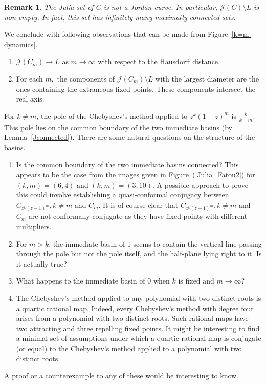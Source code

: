 \documentclass[12pt]{article}
\newtheorem{rem}{Remark}[section]
\begin{document}
\begin{rem}
	The Julia set of $C$ is not a Jordan curve. In particular, $\mathcal{J}(C) \setminus L$ is non-empty. In fact, this set  has infinitely many  maximally connected sets.
\end{rem}



We conclude  with	
 following observations that can be made from Figure~\ref{k=m-dynamics}.
\begin{enumerate}
	
	\item   $\mathcal{J}(C_m) \to L$ as $m \to \infty$ with respect to the Hausdorff distance.
	\item For each $m,$ the components of $\mathcal{J}(C_m) \setminus L$ with the largest diameter are the ones containing the extraneous fixed points. These components intersect  the real axis. 
	
\end{enumerate}

 
For $k \neq m$, the pole of the Chebyshev's method applied to $z^k (1-z)^m$  is $\frac{k}{k+m}$. This pole lies on the common boundary of the two immediate basins (by Lemma~\ref{Jconnected}). 
There are some natural questions on the structure of the basins.



\begin{enumerate}
\item Is the  common boundary of the two immediate basins  connected? This appears to be the case  from the images given in Figure~(\ref{Julia_Fatou2}) for $(k,m)=(6,4)$ and $(k,m)=(3,10)$. A possible approach to prove this could involve establishing a quasi-conformal conjugacy between $C_{z^k (z-1)^m}, k \neq m$ and $C_m$. It is of course clear that $C_{z^k (z-1)^m}, k \neq m$ and $C_m$ are not conformally conjugate as they have fixed points with different multipliers.
	\item For $m>k$, the immediate basin of $1$ seems to contain the vertical line passing through the pole but not the pole itself, and the half-plane lying right to it. Is it actually true?
	\item  What happens to the immediate basin of $0$ when $k$ is fixed and $m \to \infty$?
	\item The Chebyshev's method applied to any polynomial with two distinct roots is a quartic rational map. Indeed,  every Chebyshev's method with degree four arises from a polynomial with two distinct roots. Such rational maps have two attracting  and three repelling fixed points.  It might be interesting to find a minimal set of assumptions under which a quartic rational map is conjugate (or equal) to the Chebyshev's method applied to a polynomial with two distinct roots.
\end{enumerate}
A proof or a counterexample to any of these would be interesting to know.
\end{document}
